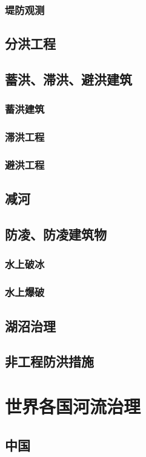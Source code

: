 \documentclass[UTF8]{../../ApplicationUniverse}
\begin{document}
        \subsubsection{堤防观测}
    \subsection{分洪工程}
    \subsection{蓄洪、滞洪、避洪建筑}
        \subsubsection{蓄洪建筑}
        \subsubsection{滞洪工程}
        \subsubsection{避洪工程}
    \subsection{减河}
    \subsection{防凌、防凌建筑物}
        \subsubsection{水上破冰}
        \subsubsection{水上爆破}
    \subsection{湖沼治理}
    \subsection{非工程防洪措施}
\section{世界各国河流治理}
    \subsection{中国}
\end{document}
